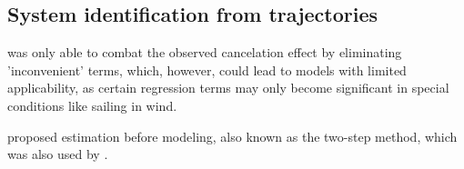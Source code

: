 \subsection{System identification from trajectories} \label{sec:literature_system_identification}

\textcite{abkowitz_measurement_1980} was only able to combat the observed cancelation effect by eliminating 'inconvenient' terms, which, however, could lead to models with limited applicability, as certain regression terms may only become significant in special conditions like sailing in wind.



\textcite{yoon_identification_2003} proposed estimation before modeling, also known as the two-step method, which was also used by \textcite{sutulo_algorithm_2014}. 